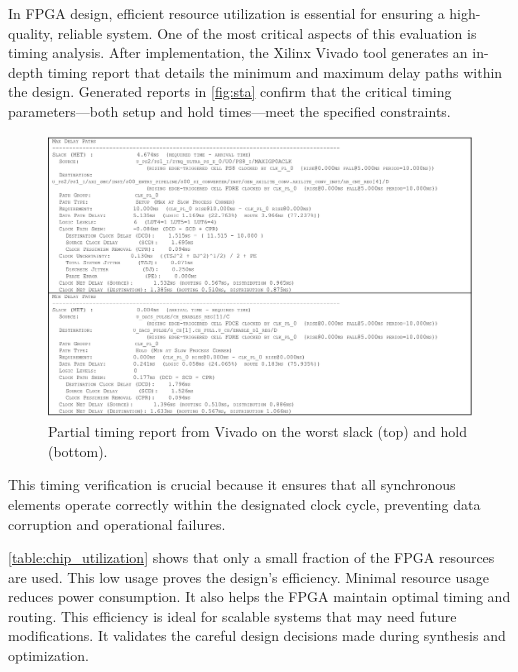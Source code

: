 In FPGA design, efficient resource utilization is essential for ensuring a high-quality, reliable system. One of the most critical aspects of this evaluation is timing analysis. After implementation, the Xilinx Vivado tool generates an in-depth timing report that details the minimum and maximum delay paths within the design. Generated reports in \autoref{fig:sta} confirm that the critical timing parameters—both setup and hold times—meet the specified constraints.
\begin{figure}[ht]
    \centering
    \includegraphics[width=1\linewidth]{figures/timimg_report.png}
    \caption{Partial timing report from Vivado on the worst slack (top) and hold (bottom).}
    \label{fig:sta}
\end{figure}
This timing verification is crucial because it ensures that all synchronous elements operate correctly within the designated clock cycle, preventing data corruption and operational failures. 

\autoref{table:chip_utilization} shows that only a small fraction of the FPGA resources are used. This low usage proves the design's efficiency. Minimal resource usage reduces power consumption. It also helps the FPGA maintain optimal timing and routing. This efficiency is ideal for scalable systems that may need future modifications. It validates the careful design decisions made during synthesis and optimization.

